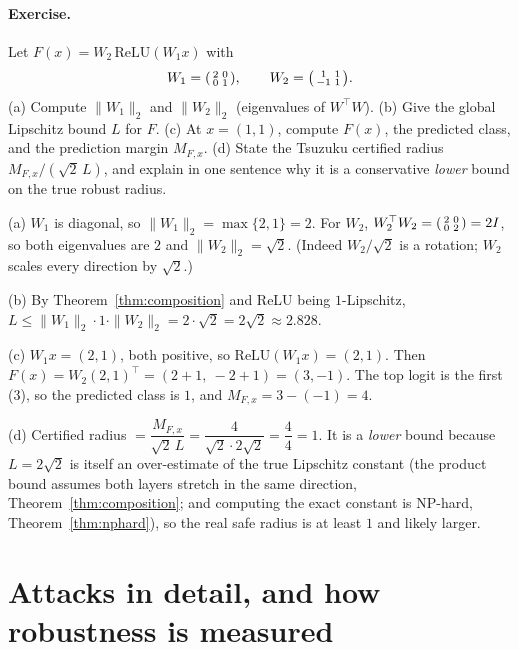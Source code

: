 \paragraph{Exercise.} Let $F(x)=W_2\,\mathrm{ReLU}(W_1 x)$ with
\[
  W_1=\begin{psmallmatrix}2&0\\0&1\end{psmallmatrix},\qquad
  W_2=\begin{psmallmatrix}1&1\\-1&1\end{psmallmatrix}.
\]
(a) Compute $\|W_1\|_2$ and $\|W_2\|_2$ (eigenvalues of $W^\top W$). (b) Give the global Lipschitz bound $L$ for $F$. (c) At $x=(1,1)$, compute $F(x)$, the predicted class, and the prediction margin $M_{F,x}$. (d) State the Tsuzuku certified radius $M_{F,x}/(\sqrt2\,L)$, and explain in one sentence why it is a conservative \emph{lower} bound on the true robust radius.

\begin{solution}
(a) $W_1$ is diagonal, so $\|W_1\|_2 = \max\{2,1\}=2$. For $W_2$, $W_2^\top W_2=\begin{psmallmatrix}2&0\\0&2\end{psmallmatrix}=2I$, so both eigenvalues are $2$ and $\|W_2\|_2=\sqrt2$. (Indeed $W_2/\sqrt2$ is a rotation; $W_2$ scales every direction by $\sqrt2$.)

(b) By Theorem~\ref{thm:composition} and ReLU being $1$-Lipschitz, $L \le \|W_1\|_2\cdot1\cdot\|W_2\|_2 = 2\cdot\sqrt2 = 2\sqrt2 \approx 2.828$.

(c) $W_1 x = (2,1)$, both positive, so $\mathrm{ReLU}(W_1x)=(2,1)$. Then
$F(x)=W_2(2,1)^\top = (2+1,\ -2+1) = (3,-1)$.
The top logit is the first ($3$), so the predicted class is $1$, and $M_{F,x}=3-(-1)=4$.

(d) Certified radius $= \dfrac{M_{F,x}}{\sqrt2\,L} = \dfrac{4}{\sqrt2\cdot 2\sqrt2} = \dfrac{4}{4} = 1.$ It is a \emph{lower} bound because $L=2\sqrt2$ is itself an over-estimate of the true Lipschitz constant (the product bound assumes both layers stretch in the same direction, Theorem~\ref{thm:composition}; and computing the exact constant is NP-hard, Theorem~\ref{thm:nphard}), so the real safe radius is at least $1$ and likely larger.
\end{solution}

\section{Attacks in detail, and how robustness is measured}
\label{sec:attacks}

